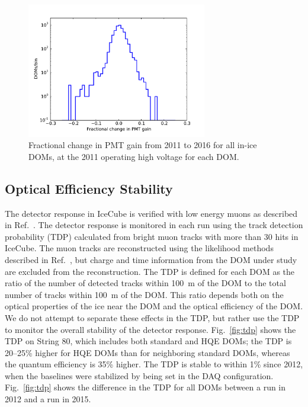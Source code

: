 \begin{figure}[!h]
 \centering
 \includegraphics[width=0.7\textwidth]{graphics/dom/reliability/pmt_gainshift.pdf}
 \caption{Fractional change in PMT gain from 2011 to 2016 for all in-ice
   DOMs, at the 2011 operating high voltage for each DOM.}
 \label{fig:pmt_gainshift}
\end{figure}

\subsection{\label{sec:optical_stability}Optical Efficiency Stability}

The detector response in IceCube is verified with low energy muons as
described in Ref.~\cite{IC3:ereco}. The detector response is monitored in each run using the track
detection probability (TDP) calculated from bright muon tracks
with more than 30 hits in IceCube. The muon 
tracks are reconstructed using the likelihood methods described in
Ref.~\cite{Ahrens:2003fg}, but charge and time information from the DOM under
study are excluded from the reconstruction. The TDP is
defined for each DOM as the ratio of the number of detected tracks
within 100~m of the DOM to the total number of tracks within 100~m of
the DOM. This ratio depends both on the optical properties of the ice
near the DOM and the optical efficiency of the DOM. We do not attempt
to separate
these effects in the TDP, but rather use the TDP to monitor the
overall stability of the detector response. Fig.~\ref{fig:tdp} shows the TDP on
String 80, which includes both standard and HQE DOMs; the TDP is
20--25\% higher for HQE DOMs than for neighboring standard
DOMs, whereas the quantum efficiency is 35\% higher. The TDP is stable to within 1\% since 2012, when the baselines
were stabilized by being set in the DAQ configuration. Fig.~\ref{fig:tdp} shows
the difference in the TDP for all DOMs between a run in 2012 and a run
in 2015.

